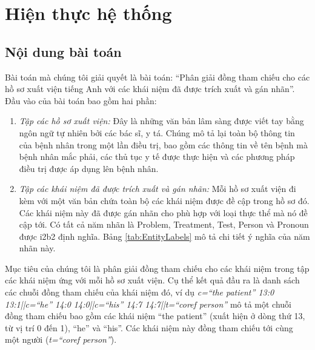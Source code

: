 \chapter{Hiện thực hệ thống}
\section{Nội dung bài toán}
Bài toán mà chúng tôi giải quyết là bài toán: ``Phân giải đồng tham chiếu cho các hồ sơ xuất viện tiếng Anh với các khái niệm đã được trích xuất và gán nhãn''. Đầu vào của bài toán bao gồm hai phần:

\begin{enumerate}[leftmargin=\the\parindent]
\item \emph{Tập các hồ sơ xuất viện: }Đây là những văn bản lâm
sàng được viết tay bằng ngôn ngữ tự nhiên bởi các bác sĩ, y tá. Chúng
mô tả lại toàn bộ thông tin của bệnh nhân trong một lần điều trị,
bao gồm các thông tin về tên bệnh mà bệnh nhân mắc phải, các thủ tục
y tế được thực hiện và các phương pháp điều trị được áp dụng lên bệnh
nhân.
\item \emph{Tập các khái niệm đã được trích xuất và gán nhãn:}
Mỗi hồ sơ xuất viện đi kèm với một văn bản chứa toàn bộ các khái niệm
được đề cập trong hồ sơ đó. Các khái niệm này đã được gán nhãn cho
phù hợp với loại thực thể mà nó đề cập tới. Có tất cả năm nhãn là
Problem, Treatment, Test, Person và Pronoun được i2b2 định nghĩa.
Bảng \ref{tab:EntityLabels} mô tả chi tiết ý nghĩa của năm nhãn này.
\end{enumerate}

Mục tiêu của chúng tôi là phân giải đồng tham chiếu cho các khái niệm trong tập các khái niệm ứng với mỗi hồ sơ xuất viện. Cụ thể kết quả đầu ra là danh sách các chuỗi đồng tham chiếu của khái niệm đó, ví dụ \emph{c=``the patient'' 13:0 13:1||c=``he'' 14:0 14:0||c=``his'' 14:7 14:7||t=``coref person''} mô tả một chuỗi đồng tham chiếu bao gồm các khái niệm ``the patient'' (xuất hiện ở dòng thứ 13, từ vị trí 0 đến 1), ``he'' và ``his''. Các khái niệm này đồng tham chiếu tới cùng một người (\emph{t=``coref person''}).

